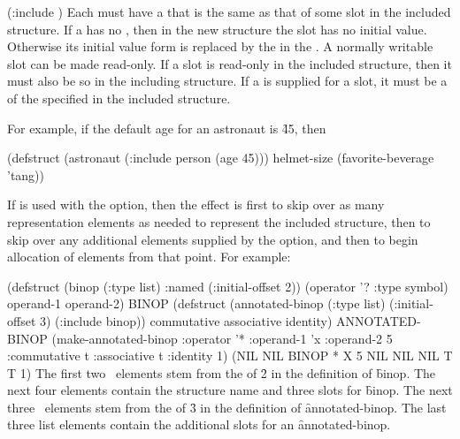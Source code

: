 \code
 (:include  )
\endcode
Each  must have a  
that is the same
as that of some slot in the included structure.
If a  has no ,
then in the new structure the slot has no initial value.
Otherwise its initial value form is replaced by
the  in the .
A normally writable slot can be made read-only.
If a slot is read-only in the included structure, then it
must also be so in the including structure.
If a  is supplied for a slot, it must be 
a  of
the
 specified in the included structure.

For example, if the
default age for an astronaut is \f{45}, then 

\code
 (defstruct (astronaut (:include person (age 45)))
    helmet-size
    (favorite-beverage 'tang))
\endcode


If  is used with the 
option, then the effect is first to skip over as many representation
elements as needed to represent the included structure, then to
skip over any additional elements supplied by the 
option, and then to begin allocation of elements from that point.
For example:

\code
 (defstruct (binop (:type list) :named (:initial-offset 2))
   (operator '? :type symbol)   
   operand-1
   operand-2) \EV BINOP
 (defstruct (annotated-binop (:type list)
                             (:initial-offset 3)
                             (:include binop))
  commutative associative identity) \EV ANNOTATED-BINOP
 (make-annotated-binop :operator '*
                       :operand-1 'x
                       :operand-2 5
                       :commutative t
                       :associative t
                       :identity 1)
   \EV (NIL NIL BINOP * X 5 NIL NIL NIL T T 1)
\endcode
The first two \nil\ elements stem from the  of \f{2}
in the definition of \f{binop}.  The next four elements contain the
structure name and three slots for \f{binop}.  The next three \nil\ elements
stem from the  of \f{3} in the definition of
\f{annotated-binop}.  The last three list elements contain the additional
slots for an \f{annotated-binop}.



